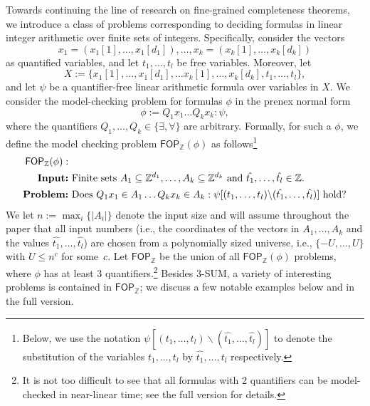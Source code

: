 Towards continuing the line of research on fine-grained completeness theorems,
we introduce a class of problems corresponding to deciding formulas in linear integer arithmetic over finite sets of integers. Specifically, consider the vectors $$x_1 =(x_1[1],\dots, x_1[d_1]) , \dots, x_k=(x_k[1],\dots, x_k[d_k])$$ as quantified variables, and let $t_1,\dots ,t_l$ be free variables.
Moreover, let 
\[X:=\{x_1[1],\dots, x_1[d_1], \dots x_k[1], \dots, x_k[d_k], t_1,\dots ,t_l\},\]
and let $\psi$ be a quantifier-free linear arithmetic formula over variables in $X$.
We consider the model-checking problem for formulas $\phi$ in the prenex normal form 
\[ \phi:=Q_1 x_1 \dots Q_k x_k: \psi, \]
where the quantifiers $Q_1, \dots, Q_k \in \{ \exists, \forall \}$ are arbitrary. Formally, for such a $\phi$, we define the model checking problem $\mathsf{FOP}_{\mathbb{Z}}(\phi)$ as follows\footnote{Below, we use the notation $\psi[(t_1,\dots, t_l) \backslash (\hat{t_1},\dots, \hat{t_l})]$ to denote the substitution of the variables $t_1,\dots,t_l$ by $\hat{t_1},\dots,\hat{t_l}$ respectively.}
\begin{align}
	\mathsf{FOP}_{\mathbb{Z}}(\phi):  & \label{model_check}\\
\textbf{Input:}& \text{ Finite sets }A_1 \subseteq \mathbb{Z}^{d_1} ,\dots, A_k \subseteq  \mathbb{Z}^{d_k}\text{ and }\hat{t_1},\dots, \hat{t_l} \in \mathbb{Z}. \notag \\
\textbf{Problem:} &\text{ Does } Q_1 x_1 \in A_1 \dots Q_k x_k \in A_k : \psi[(t_1,\dots, t_l) \backslash (\hat{t_1},\dots, \hat{t_l})] \text{ hold?} \notag
\end{align}
We let $n := \max_i\{|A_i|\}$ denote the input size and will assume throughout the paper that all input numbers (i.e., the coordinates of the vectors in $A_1,\dots, A_k$ and the values $\hat{t_1},\dots, \hat{t_l}$) are chosen from a polynomially sized universe, i.e., $\{-U, \dots, U\}$ with $U\le n^{c}$ for some~$c$.
Let $\mathsf{FOP}_{\mathbb{Z}}$ be the union of all $\mathsf{FOP}_{\mathbb{Z}}(\phi)$ problems, where $\phi$ has at least 3 quantifiers.\footnote{It is not too difficult to see that all formulas with 2 quantifiers can be model-checked in near-linear time; see the full version for details.}
Besides $3$-SUM, a variety of interesting problems is contained in $\mathsf{FOP}_{\mathbb{Z}}$; we discuss a few notable examples below and in the full version.

